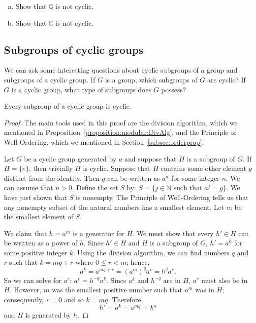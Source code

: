 \begin{exercise}{}
\begin{enumerate}[(a)]
\item
Show that ${\mathbb Q}$ is not cyclic.   
\item
Show that ${\mathbb C}$ is not cyclic.
\end{enumerate}
\end{exercise}
 
\subsection{Subgroups of cyclic groups}
 
 
We can ask some interesting questions about cyclic subgroups of a
group and subgroups of a cyclic group.  If $G$ is a group, which
subgroups of $G$ are cyclic? If $G$ is a cyclic group, what type of
subgroups does $G$ possess? 
 
 
 
\begin{thmprop}
Every subgroup of a cyclic group is cyclic.
\end{thmprop}
 
 
\begin{proof}
The main tools used in this proof are the division algorithm, which we mentioned in Proposition~\ref{proposition:modular:DivAlg},  and the
Principle of Well-Ordering, which we mentioned in Section~\ref{subsec:orderprop}.
 
Let $G$ be a cyclic group generated by $a$
and suppose that $H$ is a subgroup of $G$. If $H = \{ e \}$, then
trivially $H$ is cyclic. Suppose that $H$ contains some other element
$g$ distinct from the identity. Then $g$ can be written as
$a^n$ for some integer $n$. We can assume that $n > 0$.  
 Define the set $S$ by:  $S = \{j \in \mathbb{N} \text{ such that } a^j=g\}$. We have just shown that $S$ is nonempty. The Principle of Well-Ordering tells us that any nonempty subset of the natural numbers has  a smallest element.  Let $m$ be the smallest element of $S$.

We claim that $h = a^m$ is a generator for $H$.  We must show that
every $h' \in H$ can be written as a power of $h$. Since $h' \in H$
and $H$ is a subgroup of $G$, $h' = a^k$ for some positive integer
$k$. Using the division algorithm, we can find numbers $q$ and $r$
such that $k = mq +r$ where $0 \leq r < m$; hence,
\[
a^k = a^{mq +r} = (a^m)^q a^r = h^q a^r.
\]
So we can solve for $a^r$:  $a^r =h^{-q}  a^k $. Since $a^k$ and $h^{-q}$ are in $H$, $a^r$ must
also be in $H$.  However, $m$ was the smallest positive number such that
$a^m$ was in $H$; consequently, $r=0$ and so $k=mq$. Therefore, 
\[
h' = a^k = a^{mq} =  h^q
\]
and $H$ is generated by $h$.
\end{proof}
 
